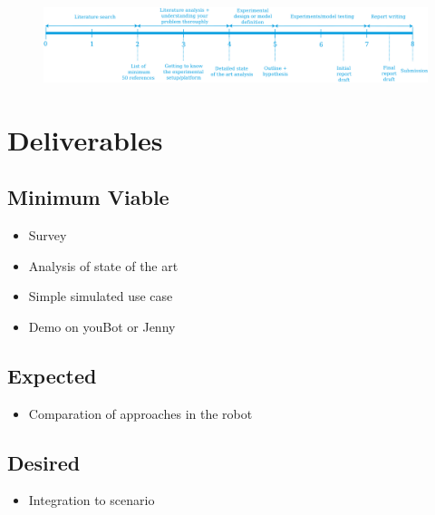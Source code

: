 \documentclass[rnd]{mas_proposal}
\begin{document}
\begin{figure}[h!]
    \includegraphics[width=\textwidth]{rnd_deliverable_timeline}
    \caption{}
    \label{}
\end{figure}

\section{Deliverables}
\subsection{Minimum Viable}

\begin{itemize}
    \item Survey
    \item Analysis of state of the art
    \item Simple simulated use case
    \item Demo on youBot or Jenny
\end{itemize}

\subsection{Expected}
\begin{itemize}
    \item Comparation of approaches in the robot
\end{itemize}

\subsection{Desired}
\begin{itemize}
    \item Integration to scenario
\end{itemize}


\nocite{*}

\end{document}
